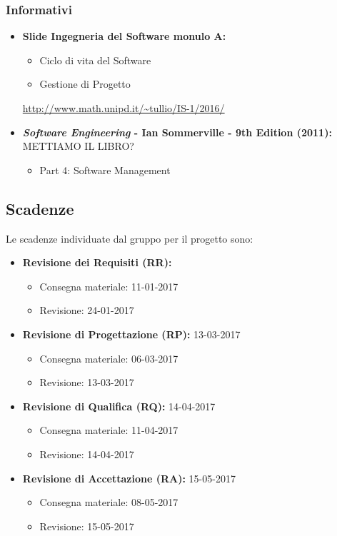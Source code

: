 \subsubsection{Informativi}
\begin{itemize}
\item \textbf{Slide Ingegneria del Software monulo A:}
\begin{itemize}
\item Ciclo di vita del Software
\item Gestione di Progetto
\end{itemize}
\url{http://www.math.unipd.it/~tullio/IS-1/2016/}
\item \textbf{\textit{Software Engineering} - Ian Sommerville - 9th Edition (2011):} METTIAMO IL LIBRO?
\begin{itemize}
\item Part 4: Software Management
\end{itemize} 
\end{itemize}

\subsection{Scadenze}
Le scadenze individuate dal gruppo \GroupName{} per il progetto \ProjectName{} sono:
\begin{itemize}
	\item \textbf{Revisione dei Requisiti (RR):}
	\begin{itemize}
		\item Consegna materiale: 11-01-2017
		\item Revisione: 24-01-2017
	\end{itemize}
	\item \textbf{Revisione di Progettazione (RP):} 13-03-2017
	\begin{itemize}
		\item Consegna materiale: 06-03-2017
		\item Revisione: 13-03-2017
	\end{itemize}
	\item \textbf{Revisione di Qualifica (RQ):} 14-04-2017
	\begin{itemize}
		\item Consegna materiale: 11-04-2017
		\item Revisione: 14-04-2017
	\end{itemize}
	\item \textbf{Revisione di Accettazione (RA):} 15-05-2017
	\begin{itemize}
		\item Consegna materiale: 08-05-2017
		\item Revisione: 15-05-2017
	\end{itemize}
\end{itemize}

